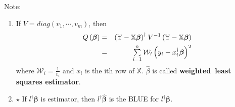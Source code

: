 \documentclass{article}
\begin{document}
\bigskip

Note:

\begin{enumerate}
\item If $V=diag\left( v_{1},\cdots ,v_{m}\right) $, then%
\begin{eqnarray*}
Q\left( \boldsymbol{\beta }\right) &=&\left( \mathbb{Y-X}\boldsymbol{\beta }%
\right) ^{\dagger }V^{-1}\left( \mathbb{Y-X}\boldsymbol{\beta }\right) \\
&=&\tsum\limits_{i=1}^{n}\mathcal{W}_{i}\left( y_{i}-x_{i}^{\dagger }%
\boldsymbol{\beta }\right) ^{2}
\end{eqnarray*}%
where $\mathcal{W}_{i}=\frac{1}{v_{i}}$ and $x_{i}$ is the ith row of $%
\mathbb{X}$. $\hat{\beta}$ is called \textbf{weighted\ least squares
estimator}.

\item $\star $ If $l^{\dagger }\boldsymbol{\beta }$ is estimator, then $%
l^{\dagger }\boldsymbol{\hat{\beta}}$ is the BLUE for $l^{\dagger }%
\boldsymbol{\beta }$.\newline
\newline
\end{enumerate}
\end{document}
